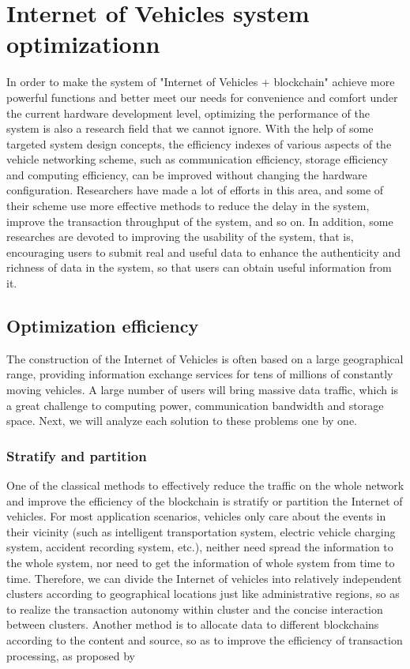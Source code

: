\section{Internet of Vehicles system optimizationn}

In order to make the system of "Internet of Vehicles + blockchain" achieve more powerful functions and better meet our needs for convenience and comfort under the current hardware development level, optimizing the performance of the system is also a research field that we cannot ignore. With the help of some targeted system design concepts, the efficiency indexes of various aspects of the vehicle networking scheme, such as communication efficiency, storage efficiency and computing efficiency, can be improved without changing the hardware configuration. Researchers have made a lot of efforts in this area, and some of their scheme use more effective methods to reduce the delay in the system, improve the transaction throughput of the system, and so on. In addition, some researches are devoted to improving the usability of the system, that is, encouraging users to submit real and useful data to enhance the authenticity and richness of data in the system, so that users can obtain useful information from it.

\subsection{Optimization efficiency}
The construction of the Internet of Vehicles is often based on a large geographical range, providing information exchange services for tens of millions of constantly moving vehicles. A large number of users will bring massive data traffic, which is a great challenge to computing power, communication bandwidth and storage space. Next, we will analyze each solution to these problems one by one.
\subsubsection{Stratify and partition}

One of the classical methods to effectively reduce the traffic on the whole network and improve the efficiency of the blockchain is stratify or partition the Internet of vehicles. For most application scenarios, vehicles only care about the events in their vicinity (such as intelligent transportation system, electric vehicle charging system, accident recording system, etc.), neither need spread the information to the whole system, nor need to get the information of whole system from time to time. Therefore, we can divide the Internet of vehicles into relatively independent clusters according to geographical locations just like administrative regions, so as to realize the transaction autonomy within cluster and the concise interaction between clusters. Another method is to allocate data to different blockchains according to the content and source, so as to improve the efficiency of transaction processing, as proposed by \cite{ref54}

